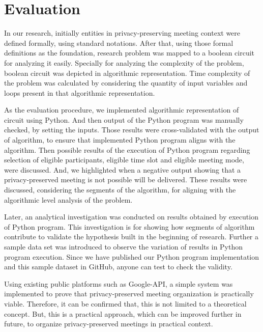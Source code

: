 \section{Evaluation}
\indent \par In our research, initially entities in privacy-preserving meeting context were defined formally, using standard notations. After that, using those formal definitions as the foundation, research problem was mapped to a boolean circuit for analyzing it easily. Specially for analyzing the complexity of the problem, boolean circuit was depicted in algorithmic representation. Time complexity of the problem was calculated by considering the quantity of input variables and loops present in that algorithmic representation.\\
\par As the evaluation procedure, we implemented algorithmic representation of circuit using Python. And then output of the Python program was manually checked, by setting the inputs. Those results were cross-validated with the output of algorithm, to ensure that implemented Python program aligns with the algorithm. Then possible results of the execution of Python program regarding selection of eligible participants, eligible time slot and eligible meeting mode, were discussed. And, we highlighted when a negative output showing that a privacy-preserved meeting is not possible will be delivered. These results were discussed, considering the segments of the algorithm, for aligning with the algorithmic level analysis of the problem.\\
\par Later, an analytical investigation was conducted on results obtained by execution of Python program. This investigation is for showing how segments of algorithm contribute to validate the hypothesis built in the beginning of research. Further a sample data set was introduced to observe the variation of results in Python program execution. Since we have published our Python program implementation and this sample dataset in GitHub, anyone can test to check the validity.\\
\par Using existing public platforms such as Google-API, a simple system was implemented to prove that privacy-preserved meeting organization is practically viable. Therefore, it can be confirmed that, this is not limited to a theoretical concept. But, this is a practical approach, which can be improved further in future, to organize privacy-preserved meetings in practical context.\\
